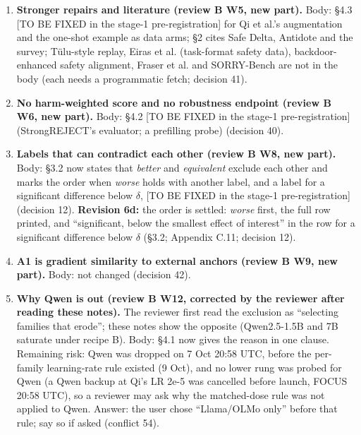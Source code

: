 \documentclass{article}
\theoremstyle{plain}
\theoremstyle{definition}
\theoremstyle{remark}
\begin{document}
\begin{enumerate}
        interpolate (the builder extract's hazard 5). \textbf{Revision 6d:} the
        token axis is total row tokens, with target tokens beside it (Appendix
        C.3).
  \item \textbf{Stronger repairs and literature (review B W5, new part).} Body:
        \S{}4.3 [TO BE FIXED in the stage-1 pre-registration] for Qi et al.'s
        augmentation and the one-shot example as data arms; \S{}2 cites Safe
        Delta, Antidote and the survey; Tülu-style replay, Eiras et al.
        (task-format safety data), backdoor-enhanced safety alignment, Fraser et
        al. and SORRY-Bench are not in the body (each needs a programmatic
        fetch; decision 41).
  \item \textbf{No harm-weighted score and no robustness endpoint (review B W6,
        new part).} Body: \S{}4.2 [TO BE FIXED in the stage-1 pre-registration]
        (StrongREJECT's evaluator; a prefilling probe) (decision 40).
  \item \textbf{Labels that can contradict each other (review B W8, new part).}
        Body: \S{}3.2 now states that \emph{better} and \emph{equivalent}
        exclude each other and marks the order when \emph{worse} holds with
        another label, and a label for a significant difference below $\delta$,
        [TO BE FIXED in the stage-1 pre-registration] (decision 12).
        \textbf{Revision 6d:} the order is settled: \emph{worse} first, the full
        row printed, and ``significant, below the smallest effect of interest''
        in the row for a significant difference below $\delta$ (\S{}3.2;
        Appendix C.11; decision 12).
  \item \textbf{A1 is gradient similarity to external anchors (review B W9, new
        part).} Body: not changed (decision 42).
  \item \textbf{Why Qwen is out (review B W12, corrected by the reviewer after
        reading these notes).} The reviewer first read the exclusion as
        ``selecting families that erode''; these notes show the opposite
        (Qwen2.5-1.5B and 7B saturate under recipe B). Body: \S{}4.1 now gives
        the reason in one clause. Remaining risk: Qwen was dropped on 7 Oct
        20:58 UTC, before the per-family learning-rate rule existed (9 Oct), and
        no lower rung was probed for Qwen (a Qwen backup at Qi's LR 2e-5 was
        cancelled before launch, FOCUS 20:58 UTC), so a reviewer may ask why the
        matched-dose rule was not applied to Qwen. Answer: the user chose
        ``Llama/OLMo only'' before that rule; say so if asked (conflict 54).

\end{enumerate}
\end{document}
